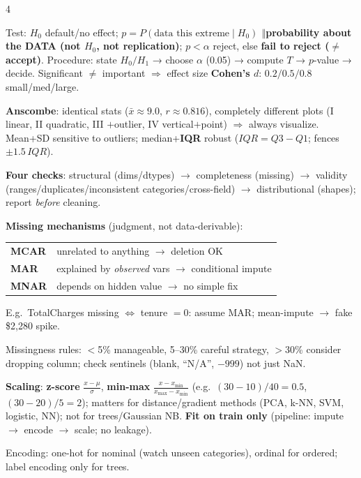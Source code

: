 \documentclass[a4paper,fontsize=8pt]{scrartcl}
\newenvironment{ul}{\begin{list}{\textbullet}{\setlength{\leftmargin}{1.05em}\setlength{\labelwidth}{0.6em}\setlength{\labelsep}{0.35em}\setlength{\itemsep}{0.45pt}\setlength{\parsep}{0pt}\setlength{\topsep}{0.65pt}\setlength{\partopsep}{0pt}}}{\end{list}}
\newcommand{\secG}[1]{\vspace{2.4pt}{\colorbox{hdrG}{\color{white}\bfseries\sffamily\scriptsize\ #1\ }}\par\vspace{1.4pt}}
\newcommand{\sep}{\ensuremath{\boldsymbol{\Vert}}}
\newcommand{\fn}[1]{\colorbox{hlp}{\textbf{#1}}}
\begin{document}
\begin{multicols*}{4}
\begin{ul}
\item Test: $H_0$ default/no effect; \textbf{$p=P(\text{data this extreme}\mid H_0)$ \sep probability about the DATA (not $H_0$, not replication)}; $p<\alpha$ reject, else \textbf{fail to reject ($\ne$ accept)}. Procedure: state $H_0/H_1$ → choose $\alpha$ (0.05) → compute $T$ → $p$-value → decide. Significant $\ne$ important $\Rightarrow$ effect size \fn{Cohen's $d$}: $0.2/0.5/0.8$ small/med/large.
\item \fn{Anscombe}: identical stats ($\bar x\approx9.0$, $r\approx0.816$), completely different plots (I linear, II quadratic, III $+$outlier, IV vertical$+$point) $\Rightarrow$ always visualize. Mean+SD sensitive to outliers; median+\fn{IQR} robust ($IQR=Q3-Q1$; fences $\pm1.5\,IQR$).
\end{ul}

\secG{L4/L1 · WRANGLING QUICK}
\begin{ul}
\item \textbf{Four checks}: structural (dims/dtypes) $\to$ completeness (missing) $\to$ validity (ranges/duplicates/inconsistent categories/cross-field) $\to$ distributional (shapes); report \emph{before} cleaning.
\item \textbf{Missing mechanisms} (judgment, not data-derivable):\\
{\footnotesize
\begin{tabular}{@{}l p{4.35cm}@{}}
\textbf{MCAR} & unrelated to anything $\to$ deletion OK\\
\textbf{MAR} & explained by \emph{observed} vars $\to$ conditional impute\\
\textbf{MNAR} & depends on hidden value $\to$ no simple fix\\
\end{tabular}}\par
E.g.\ TotalCharges missing $\Leftrightarrow$ tenure $=0$: assume MAR; mean-impute $\to$ fake \$2{,}280 spike.
\item Missingness rules: $<$5\% manageable, 5--30\% careful strategy, $>$30\% consider dropping column; check sentinels (blank, ``N/A'', $-999$) not just NaN.
\item \textbf{Scaling}: \fn{z-score} $\frac{x-\mu}{\sigma}$, \fn{min-max} $\frac{x-x_{\min}}{x_{\max}-x_{\min}}$ (e.g.\ $(30{-}10)/40=0.5$, $(30{-}20)/5=2$); matters for distance/gradient methods (PCA, k-NN, SVM, logistic, NN); not for trees/Gaussian NB. \textbf{Fit on train only} (pipeline: impute $\to$ encode $\to$ scale; no leakage).
\item Encoding: one-hot for nominal (watch unseen categories), ordinal for ordered; label encoding only for trees.

\end{ul}
\end{multicols*}
\end{document}
